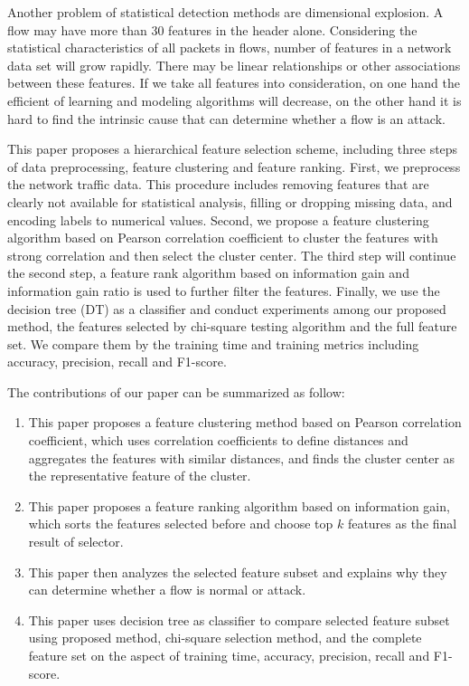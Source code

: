 \documentclass{ieeeaccess}
\theoremstyle{definition}
\begin{document}
Another problem of statistical detection methods are dimensional explosion. A flow may have more than 30 features in the header alone. Considering the statistical characteristics of all packets in flows, number of features in a network data set will grow rapidly. There may be linear relationships or other associations between these features. If we take all features into consideration, on one hand the efficient of learning and modeling algorithms will decrease, on the other hand it is hard to find the intrinsic cause that can determine whether a flow is an attack.

This paper proposes a hierarchical feature selection scheme, including three steps of data preprocessing, feature clustering and feature ranking. First, we preprocess the network traffic data. This procedure includes removing features that are clearly not available for statistical analysis, filling or dropping missing data, and encoding labels to numerical values. Second, we propose a feature clustering algorithm based on Pearson correlation coefficient to cluster the features with strong correlation and then select the cluster center. The third step will continue the second step, a feature rank algorithm based on information gain and information gain ratio is used to further filter the features. Finally, we use the decision tree (DT) as a classifier and conduct experiments among our proposed method, the features selected by chi-square testing algorithm and the full feature set. We compare them by the training time and training metrics including accuracy, precision, recall and F1-score. 

The contributions of our paper can be summarized as follow:

\begin{enumerate}
    \item This paper proposes a feature clustering method based on Pearson correlation coefficient, which uses correlation coefficients to define distances and aggregates the features with similar distances, and finds the cluster center as the representative feature of the cluster.
    \item This paper proposes a feature ranking algorithm based on information gain, which sorts the features selected before and choose top $k$ features as the final result of selector.
    \item This paper then analyzes the selected feature subset and explains why they can determine whether a flow is normal or attack.
    \item This paper uses decision tree as classifier to compare selected feature subset using proposed method, chi-square selection method, and the complete feature set on the aspect of training time, accuracy, precision, recall and F1-score.
\end{enumerate}
\end{document}
